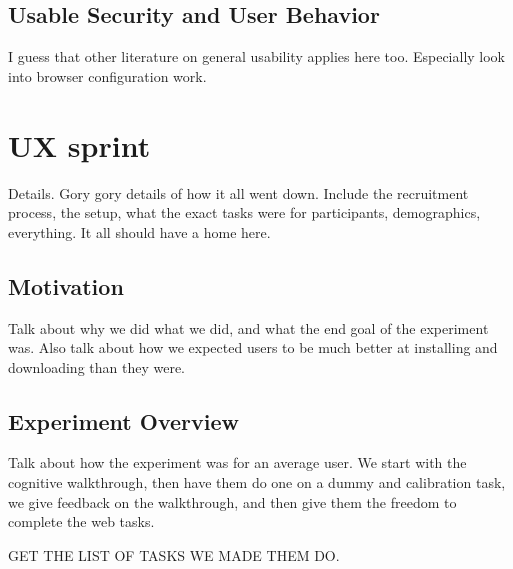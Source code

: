 \documentclass[letterpaper,twocolumn,11pt]{article}
\begin{document}
\subsection{Usable Security and User Behavior}
\indent {}

{\color {red}  I guess that other literature on general usability applies here too. %
Especially look into browser configuration work. }

\appendix

\section{UX sprint} 
\label{sec:pilot}
 {\color {red}Details. Gory gory details of how it all went down. 
Include the recruitment process, the setup, what the exact 
tasks were for participants, demographics, everything. 
It all should have a home here.}


\subsection{Motivation}
{\color {red} Talk about why we did what we did, and what the end goal 
of the experiment was. Also talk about how we expected users
to be much better at installing and downloading than they were. }

\subsection{Experiment Overview}
{\color {red} Talk about how the experiment was for an average user. We start
with the cognitive walkthrough, then have them do one on a dummy
and calibration task, we give feedback on the walkthrough, and then 
give them the freedom to complete the web tasks. 

GET THE LIST OF TASKS WE MADE THEM DO.}
\end{document}
